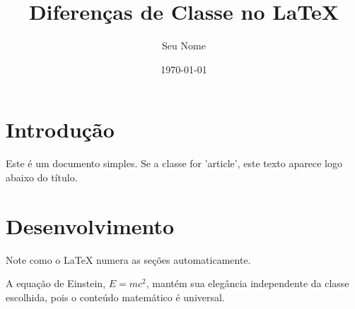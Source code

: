\documentclass[12pt]{report}
\title{Diferenças de Classe no LaTeX}
\author{Seu Nome}
\date{\today}
\begin{document}
\maketitle %

\section{Introdução}
Este é um documento simples. Se a classe for 'article', este texto aparece logo abaixo do título.


\section{Desenvolvimento}
Note como o LaTeX numera as seções automaticamente. 

A equação de Einstein, $E=mc^2$, mantém sua elegância independente da classe escolhida, pois o conteúdo matemático é universal.
\end{document}
